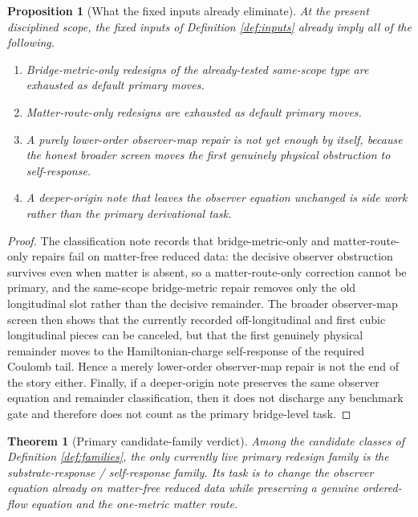 \documentclass[11pt]{article}
\newtheorem{proposition}{Proposition}
\newtheorem{theorem}{Theorem}
\begin{document}
\begin{proposition}[What the fixed inputs already eliminate]
\label{prop:eliminate}
At the present disciplined scope, the fixed inputs of Definition \ref{def:inputs} already imply all of the following.
\begin{enumerate}
    \item Bridge-metric-only redesigns of the already-tested same-scope type are exhausted as default primary moves.
    \item Matter-route-only redesigns are exhausted as default primary moves.
    \item A purely lower-order observer-map repair is not yet enough by itself, because the honest broader screen moves the first genuinely physical obstruction to self-response.
    \item A deeper-origin note that leaves the observer equation unchanged is side work rather than the primary derivational task.
\end{enumerate}
\end{proposition}

\begin{proof}
The classification note records that bridge-metric-only and matter-route-only repairs fail on matter-free reduced data: the decisive observer obstruction survives even when matter is absent, so a matter-route-only correction cannot be primary, and the same-scope bridge-metric repair removes only the old longitudinal slot rather than the decisive remainder. The broader observer-map screen then shows that the currently recorded off-longitudinal and first cubic longitudinal pieces can be canceled, but that the first genuinely physical remainder moves to the Hamiltonian-charge self-response of the required Coulomb tail. Hence a merely lower-order observer-map repair is not the end of the story either. Finally, if a deeper-origin note preserves the same observer equation and remainder classification, then it does not discharge any benchmark gate and therefore does not count as the primary bridge-level task.
\end{proof}

\begin{theorem}[Primary candidate-family verdict]
\label{thm:family}
Among the candidate classes of Definition \ref{def:families}, the only currently live primary redesign family is the substrate-response / self-response family. Its task is to change the observer equation already on matter-free reduced data while preserving a genuine ordered-flow equation and the one-metric matter route.
\end{theorem}
\end{document}
